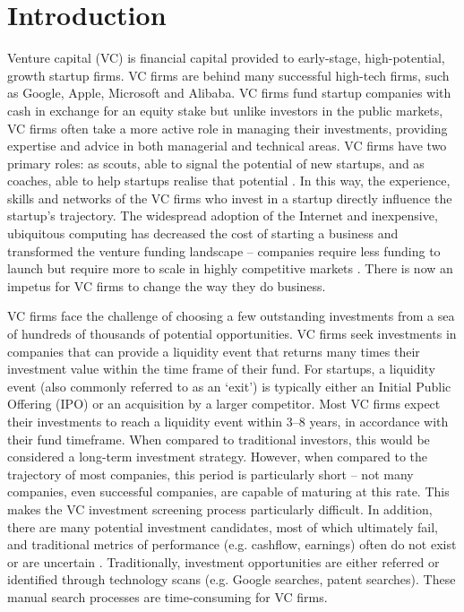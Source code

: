 \documentclass[../thesis/thesis.tex]{subfiles}
\begin{document}
 \chapter{Introduction}

Venture capital (VC) is financial capital provided to early-stage, high-potential, growth startup firms. VC firms are behind many successful high-tech firms, such as Google, Apple, Microsoft and Alibaba. VC firms fund startup companies with cash in exchange for an equity stake but unlike investors in the public markets, VC firms often take a more active role in managing their investments, providing expertise and advice in both managerial and technical areas. VC firms have two primary roles: as scouts, able to signal the potential of new startups, and as coaches, able to help startups realise that potential \cite{baum2004}. In this way, the experience, skills and networks of the VC firms who invest in a startup directly influence the startup’s trajectory. The widespread adoption of the Internet and inexpensive, ubiquitous computing has decreased the cost of starting a business and transformed the venture funding landscape -- companies require less funding to launch but require more to scale in highly competitive markets \cite{graham2013}. There is now an impetus for VC firms to change the way they do business.

VC firms face the challenge of choosing a few outstanding investments from a sea of hundreds of thousands of potential opportunities. VC firms seek investments in companies that can provide a liquidity event that returns many times their investment value within the time frame of their fund. For startups, a liquidity event (also commonly referred to as an `exit’) is typically either an Initial Public Offering (IPO) or an acquisition by a larger competitor. Most VC firms expect their investments to reach a liquidity event within 3--8 years, in accordance with their fund timeframe. When compared to traditional investors, this would be considered a long-term investment strategy. However, when compared to the trajectory of most companies, this period is particularly short -- not many companies, even successful companies, are capable of maturing at this rate. This makes the VC investment screening process particularly difficult. In addition, there are many potential investment candidates, most of which ultimately fail, and traditional metrics of performance (e.g. cashflow, earnings) often do not exist or are uncertain \cite{shane2002}. Traditionally, investment opportunities are either referred or identified through technology scans (e.g. Google searches, patent searches). These manual search processes are time-consuming for VC firms.
\end{document}
